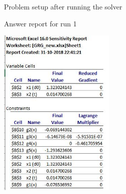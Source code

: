 \documentclass[12pt]{article}
\begin{document}
\begin{enumerate}[I]
\begin{enumerate}[1)]
\begin{figure}[!hp]
  \caption{Problem setup after running the solver}
\end{figure}
\begin{figure}[!htbp]
    \caption{Answer report for run 1}
\end{figure}
\begin{figure}[!htbp]
  \centering
    \includegraphics[width=0.5\textwidth]{sens1.JPG}

\end{figure}
\end{enumerate}
\end{enumerate}
\end{document}
